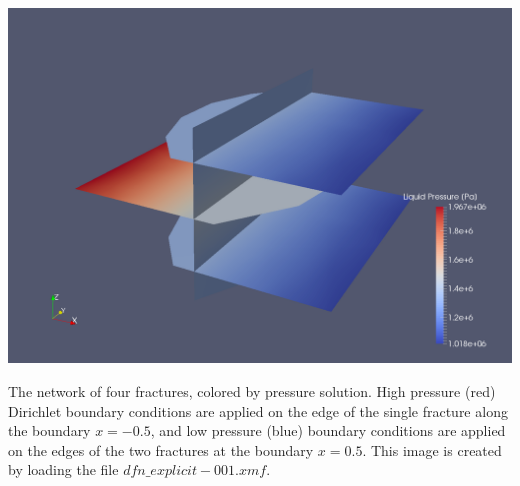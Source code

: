 \documentclass{article}
\begin{document}
\begin{center}
\includegraphics[width=0.75\linewidth]{figs/test_4_fracture_pressure.png}\\
\end{center}
The network of four fractures,  colored by pressure solution.  
High pressure (red) Dirichlet boundary conditions are applied on the edge of the single fracture along the boundary $x = -0.5$, and low pressure (blue)  boundary conditions are applied on the edges of the two fractures at the boundary $x = 0.5$.
This image is created by loading the file $dfn\_explicit-001.xmf$.
\end{document}
